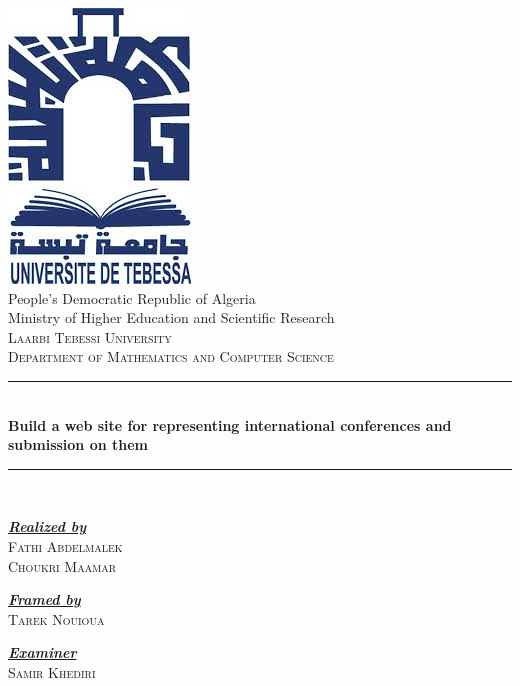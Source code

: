 \begin{titlepage}
	\begin{center}
		\includegraphics[]{./pics/univ-tebessa.jpg}\\[1cm]
		People's Democratic Republic of Algeria\\
		Ministry of Higher Education and Scientific Research\\[0.4cm]
		\textsc{\LARGE Laarbi Tebessi University}\\[0.4cm]
		\textsc{\large Department of Mathematics and Computer Science}\\[0.5cm]
		\rule{\textwidth}{0.075cm}\\[0.4cm]
		{\huge \bfseries Build a web site for representing international conferences and submission on them \\[1cm] }
		\rule{\textwidth}{0.075cm}\\[1.5cm]
		\begin{minipage}{0.4\textwidth}
			\begin{flushleft}
				\emph{\textbf{\underline{Realized by}}}\\
				\textsc{Fathi Abdelmalek}\\
				\textsc{Choukri Maamar}
			\end{flushleft}
		\end{minipage}
		\begin{minipage}{0.4\textwidth}
			\begin{flushright}
				\emph{\textbf{\underline{Framed by}}} \\
				\textsc{Tarek Nouioua}
			\end{flushright}
			\begin{flushright}
				\emph{\textbf{\underline{Examiner}}} \\
				\textsc{Samir Khediri}
			\end{flushright}
		\end{minipage}
		\vfill
	\end{center}
\end{titlepage}
